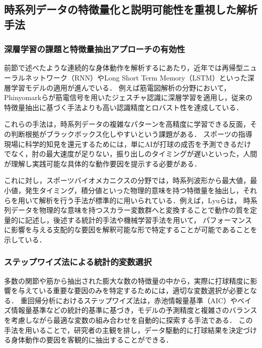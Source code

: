 \documentclass[../main]{subfiles}
\begin{document}
\subsection{時系列データの特徴量化と説明可能性を重視した解析手法}
\label{subsec:feature_extraction_ml}

\subsubsection{深層学習の課題と特徴量抽出アプローチの有効性}
前節で述べたような連続的な身体動作を解析するにあたり，近年では再帰型ニューラルネットワーク（RNN）やLong Short Term Memory（LSTM）といった深層学習モデルの適用が進んでいる．
例えば筋電図解析の分野において，Phinyomarkらが筋電信号を用いたジェスチャ認識に深層学習を適用し，従来の特徴量抽出に基づく手法よりも高い認識精度とロバスト性を達成している．

これらの手法は，時系列データの複雑なパターンを高精度に学習できる反面，その判断根拠がブラックボックス化しやすいという課題がある．
スポーツの指導現場に科学的知見を還元するためには，単にAIが打球の成否を予測できるだけでなく，肘の最大速度が足りない，振り出しのタイミングが遅いといった，人間が理解し実践可能な具体的な動作要因を提示する必要がある．

これに対し，スポーツバイオメカニクスの分野では，時系列波形から最大値，最小値，発生タイミング，積分値といった物理的意味を持つ特徴量を抽出し，それらを用いて解析を行う手法が標準的に用いられている．例えば，Lyuらは，
時系列データを物理的な意味を持つスカラー変数群へと変換することで動作の質を定量的に記述し，後述する統計的手法や機械学習手法を用いて，
パフォーマンスに影響を与える支配的な要因を解釈可能な形で特定することが可能であることを示している．

\subsubsection{ステップワイズ法による統計的変数選択}
多数の関節や筋から抽出された膨大な数の特徴量の中から，実際に打球精度に影響を与えている重要な要因のみを特定するためには，適切な変数選択が必要となる．
重回帰分析におけるステップワイズ法は，赤池情報量基準（AIC）やベイズ情報量基準などの統計的基準に基づき，モデルの予測精度と複雑さのバランスを考慮しながら最適な変数の組み合わせを自動的に探索する手法である．
この手法を用いることで，研究者の主観を排し，データ駆動的に打球結果を決定づける身体動作の要因を客観的に抽出することができる．
\end{document}
